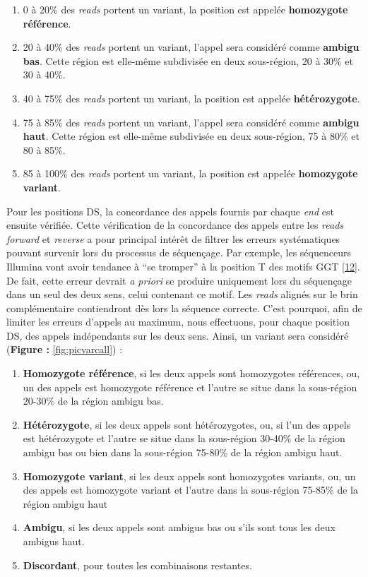 \documentclass[12pt,a4paper,twoside]{ugathesis}
\begin{document}
\begin{enumerate}
\def\labelenumi{\arabic{enumi}.}
\item
  0 à 20\% des \emph{reads} portent un variant, la position est appelée
  \textbf{homozygote référence}.
\item
  20 à 40\% des \emph{reads} portent un variant, l'appel sera considéré
  comme \textbf{ambigu bas}. Cette région est elle-même subdivisée en
  deux sous-région, 20 à 30\% et 30 à 40\%.
\item
  40 à 75\% des \emph{reads} portent un variant, la position est appelée
  \textbf{hétérozygote}.
\item
  75 à 85\% des \emph{reads} portent un variant, l'appel sera considéré
  comme \textbf{ambigu haut}. Cette région est elle-même subdivisée en
  deux sous-région, 75 à 80\% et 80 à 85\%.
\item
  85 à 100\% des \emph{reads} portent un variant, la position est
  appelée \textbf{homozygote variant}.
\end{enumerate}

Pour les positions DS, la concordance des appels fournis par chaque
\emph{end} est ensuite vérifiée. Cette vérification de la concordance
des appels entre les \emph{reads forward} et \emph{reverse} a pour
principal intérêt de filtrer les erreurs systématiques pouvant survenir
lors du processus de séquençage. Par exemple, les séquenceurs Illumina
vont avoir tendance à ``se tromper'' à la position T des motifs GGT
{[}\protect\hyperlink{ref-Robinson2011}{12}{]}. De fait, cette erreur
devrait \emph{a priori} se produire uniquement lors du séquençage dans
un seul des deux sens, celui contenant ce motif. Les \emph{reads}
alignés sur le brin complémentaire contiendront dès lors la séquence
correcte. C'est pourquoi, afin de limiter les erreurs d'appels au
maximum, nous effectuons, pour chaque position DS, des appels
indépendants sur les deux sens. Ainsi, un variant sera considéré
(\textbf{Figure : }\ref{fig:picvarcall}) :

\begin{enumerate}
\def\labelenumi{\arabic{enumi}.}
\item
  \textbf{Homozygote référence}, si les deux appels sont homozygotes
  références, ou, un des appels est homozygote référence et l'autre se
  situe dans la sous-région 20-30\% de la région ambigu bas.
\item
  \textbf{Hétérozygote}, si les deux appels sont hétérozygotes, ou, si
  l'un des appels est hétérozygote et l'autre se situe dans la
  sous-région 30-40\% de la région ambigu bas ou bien dans la
  sous-région 75-80\% de la région ambigu haut.
\item
  \textbf{Homozygote variant}, si les deux appels sont homozygotes
  variants, ou, un des appels est homozygote variant et l'autre dans la
  sous-région 75-85\% de la région ambigu haut
\item
  \textbf{Ambigu}, si les deux appels sont ambigus bas ou s'ils sont
  tous les deux ambigus haut.
\item
  \textbf{Discordant}, pour toutes les combinaisons restantes.
\end{enumerate}
\end{document}
